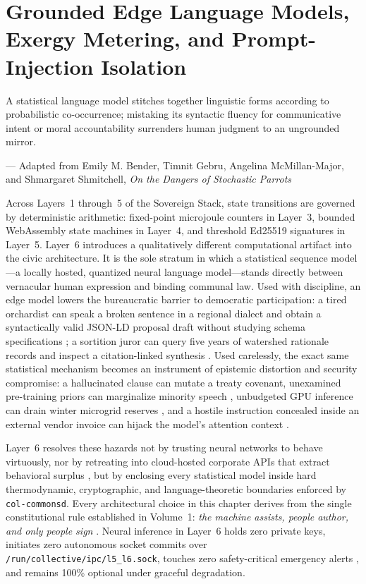 \chapter{Grounded Edge Language Models, Exergy Metering, and Prompt-Injection Isolation}
\label{ch:edge-llms}

\epigraph{A statistical language model stitches together linguistic forms according to probabilistic co-occurrence; mistaking its syntactic fluency for communicative intent or moral accountability surrenders human judgment to an ungrounded mirror.}{--- Adapted from Emily M. Bender, Timnit Gebru, Angelina McMillan-Major, and Shmargaret Shmitchell, \emph{On the Dangers of Stochastic Parrots} \parencite{bender2021parrots}}

Across Layers~1 through~5 of the Sovereign Stack, state transitions are governed by deterministic arithmetic: fixed-point microjoule counters in Layer~3, bounded WebAssembly state machines in Layer~4, and threshold Ed25519 signatures in Layer~5. Layer~6 introduces a qualitatively different computational artifact into the civic architecture. It is the sole stratum in which a statistical sequence model---a locally hosted, quantized neural language model---stands directly between vernacular human expression and binding communal law. Used with discipline, an edge model lowers the bureaucratic barrier to democratic participation: a tired orchardist can speak a broken sentence in a regional dialect and obtain a syntactically valid JSON-LD proposal draft without studying schema specifications \parencite{w3c2020jsonld,w3c2017shacl}; a sortition juror can query five years of watershed rationale records and inspect a citation-linked synthesis \parencite{fishkin1991,lewis2020rag}. Used carelessly, the exact same statistical mechanism becomes an instrument of epistemic distortion and security compromise: a hallucinated clause can mutate a treaty covenant, unexamined pre-training priors can marginalize minority speech \parencite{bender2021parrots,noble2018}, unbudgeted GPU inference can drain winter microgrid reserves \parencite{georgescu1971}, and a hostile instruction concealed inside an external vendor invoice can hijack the model's attention context \parencite{greshake2023injection,owasp2023llm}.

Layer~6 resolves these hazards not by trusting neural networks to behave virtuously, nor by retreating into cloud-hosted corporate APIs that extract behavioral surplus \parencite{zuboff2019}, but by enclosing every statistical model inside hard thermodynamic, cryptographic, and language-theoretic boundaries enforced by \texttt{col-commonsd}. Every architectural choice in this chapter derives from the single constitutional rule established in Volume~1: \emph{the machine assists, people author, and only people sign} \parencite{wiener1954,illich1973}. Neural inference in Layer~6 holds zero private keys, initiates zero autonomous socket commits over \texttt{/run/collective/ipc/l5\_l6.sock}, touches zero safety-critical emergency alerts \parencite{iec61508}, and remains 100\% optional under graceful degradation.

